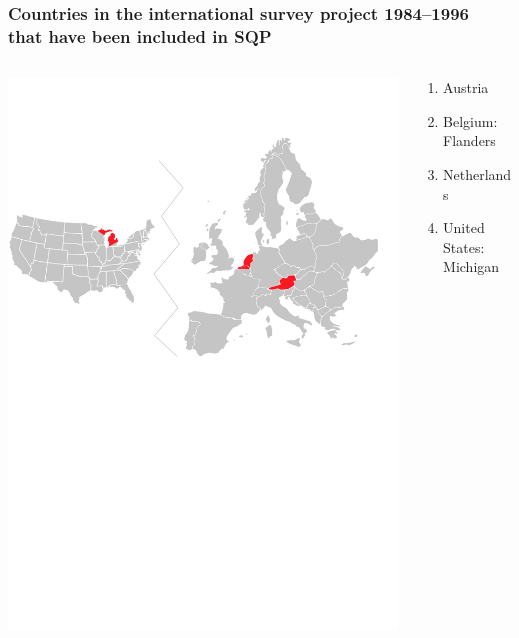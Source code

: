 \documentclass{beamer}
\begin{document}
\begin{frame}
\frametitle{Countries in the international survey project 1984--1996\\that have been included in SQP}
	\begin{columns}[T]	
		\begin{column}{8cm}
			\includegraphics[width=\textwidth]{i/andrews-etal.pdf}
		\end{column}
		\begin{column}{3.2cm}
		\begin{small}
		\begin{enumerate}
			\item Austria 
			\item Belgium: Flanders
			\item Netherlands
			\item United States: Michigan		
		\end{enumerate}
		\end{small}
		\end{column}
	\end{columns}
\end{frame}
\end{document}
